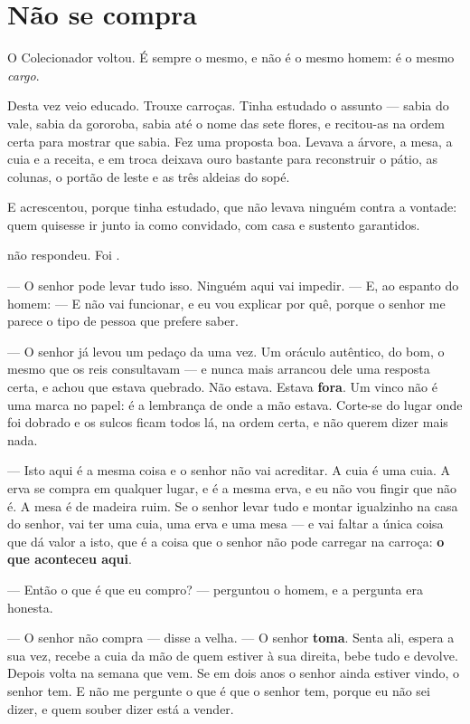 \documentclass[livro.tex]{subfiles}
\begin{document}
\section{Não se compra}

O Colecionador voltou. É sempre o mesmo, e não é o mesmo homem: é o mesmo \emph{cargo}.

Desta vez veio educado. Trouxe carroças. Tinha estudado o assunto --- sabia do vale, sabia da
gororoba, sabia até o nome das sete flores, e recitou-as na ordem certa para mostrar que sabia.
Fez uma proposta boa. Levava a árvore, a mesa, a cuia e a receita, e em troca deixava ouro
bastante para reconstruir o pátio, as colunas, o portão de leste e as três aldeias do sopé.

E acrescentou, porque tinha estudado, que não levava ninguém contra a vontade: quem quisesse ir
junto ia como convidado, com casa e sustento garantidos.

\medskip

\Ven não respondeu. Foi \Qui .

--- O senhor pode levar tudo isso. Ninguém aqui vai impedir. --- E, ao espanto do homem: --- E
não vai funcionar, e eu vou explicar por quê, porque o senhor me parece o tipo de pessoa que
prefere saber.

\medskip

--- O senhor já levou um pedaço da \Fit uma vez. Um oráculo autêntico, do bom, o mesmo que os
reis consultavam --- e nunca mais arrancou dele uma resposta certa, e achou que estava quebrado.
Não estava. Estava \textbf{fora}. Um vinco não é uma marca no papel: é a lembrança de onde a mão
estava. Corte-se do lugar onde foi dobrado e os sulcos ficam todos lá, na ordem certa, e não
querem dizer mais nada.

--- Isto aqui é a mesma coisa e o senhor não vai acreditar. A cuia é uma cuia. A erva se compra
em qualquer lugar, e é a mesma erva, e eu não vou fingir que não é. A mesa é de madeira ruim. Se
o senhor levar tudo e montar igualzinho na casa do senhor, vai ter uma cuia, uma erva e uma mesa
--- e vai faltar a única coisa que dá valor a isto, que é a coisa que o senhor não pode carregar
na carroça: \textbf{o que aconteceu aqui}.

--- Então o que é que eu compro? --- perguntou o homem, e a pergunta era honesta.

--- O senhor não compra --- disse a velha. --- O senhor \textbf{toma}. Senta ali, espera a sua
vez, recebe a cuia da mão de quem estiver à sua direita, bebe tudo e devolve. Depois volta na
semana que vem. Se em dois anos o senhor ainda estiver vindo, o senhor tem. E não me pergunte o
que é que o senhor tem, porque eu não sei dizer, e quem souber dizer está a vender.
\end{document}
